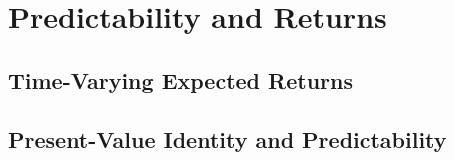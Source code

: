 \chapter{Predictability and Returns}

\section{Time-Varying Expected Returns}

\section{Present-Value Identity and Predictability}
